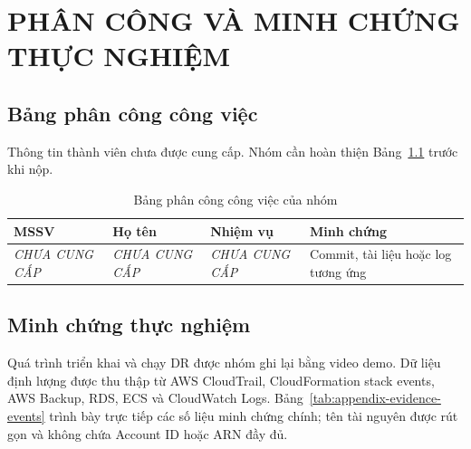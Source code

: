 \clearpage
\chapter{PHÂN CÔNG VÀ MINH CHỨNG THỰC NGHIỆM}

\section{Bảng phân công công việc}

Thông tin thành viên chưa được cung cấp. Nhóm cần hoàn thiện Bảng~\ref{tab:assignment} trước khi nộp.

\begin{table}[H]
\centering
\caption{Bảng phân công công việc của nhóm}
\label{tab:assignment}
\begin{tabularx}{\textwidth}{@{}l l X X@{}}
\toprule
\textbf{MSSV} & \textbf{Họ tên} & \textbf{Nhiệm vụ} & \textbf{Minh chứng}\\
\midrule
\textit{CHƯA CUNG CẤP} & \textit{CHƯA CUNG CẤP} & \textit{CHƯA CUNG CẤP} & Commit, tài liệu hoặc log tương ứng\\
\bottomrule
\end{tabularx}
\end{table}

\section{Minh chứng thực nghiệm}

Quá trình triển khai và chạy DR được nhóm ghi lại bằng video demo. Dữ liệu định lượng được thu thập từ AWS CloudTrail, CloudFormation stack events, AWS Backup, RDS, ECS và CloudWatch Logs. Bảng~\ref{tab:appendix-evidence-events} trình bày trực tiếp các số liệu minh chứng chính; tên tài nguyên được rút gọn và không chứa Account ID hoặc ARN đầy đủ.

